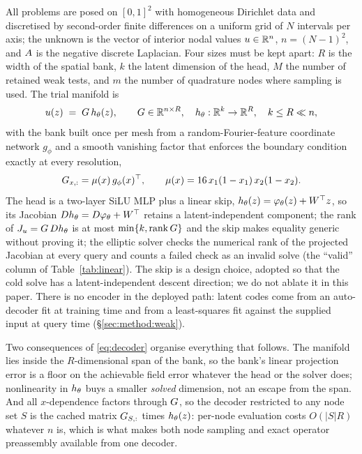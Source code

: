 All problems are posed on $[0,1]^2$ with homogeneous Dirichlet data and
discretised by second-order finite differences on a uniform grid of $N$
intervals per axis; the unknown is the vector of interior nodal values
$u\in\mathbb{R}^{n}$, $n=(N-1)^2$, and $A$ is the negative discrete Laplacian.
Four sizes must be kept apart: $R$ is the width of the spatial bank, $k$ the
latent dimension of the head, $M$ the number of retained weak tests, and $m$ the
number of quadrature nodes where sampling is used. The trial manifold is
\begin{equation}
  u(z) \;=\; G\,h_\theta(z),
  \qquad
  G\in\mathbb{R}^{n\times R},\quad
  h_\theta:\mathbb{R}^{k}\to\mathbb{R}^{R},\quad k\le R\ll n,
  \label{eq:decoder}
\end{equation}
with the bank built once per mesh from a random-Fourier-feature coordinate
network $g_\phi$ \citep{Tancik2020FourierFeatures} and a smooth vanishing
factor that enforces the boundary condition exactly at every resolution,
\begin{equation}
  G_{x,:} = \mu(x)\,g_\phi(x)^{\top},
  \qquad
  \mu(x) = 16\,x_1(1-x_1)\,x_2(1-x_2).
  \label{eq:bank}
\end{equation}
The head is a two-layer SiLU MLP plus a linear skip,
$h_\theta(z)=\varphi_\theta(z)+W^{\top}z$, so its Jacobian
$Dh_\theta=D\varphi_\theta+W^{\top}$ retains a latent-independent component; the rank
of $J_{u}=G\,Dh_\theta$ is at most $\min\{k,\operatorname{rank}G\}$ and the
skip makes equality generic without proving it; the elliptic solver checks the
numerical rank of the projected Jacobian at every query and counts a failed
check as an invalid solve (the ``valid'' column of Table~\ref{tab:linear}).
The skip is a design choice, adopted so that the cold solve has a
latent-independent descent direction; we do not ablate it in this paper. There is no
encoder in the deployed path: latent codes come from an auto-decoder fit at
training time and from a least-squares fit against the supplied input at query
time (\S\ref{sec:method:weak}).

Two consequences of \eqref{eq:decoder} organise everything that follows. The
manifold lies inside the $R$-dimensional span of the bank, so the bank's linear
projection error is a floor on the achievable field error whatever the head or
the solver does; nonlinearity in $h_\theta$ buys a smaller \emph{solved} dimension,
not an escape from the span. And all $x$-dependence factors through $G$, so
the decoder restricted to any node set $S$ is the cached matrix $G_{S,:}$
times $h_\theta(z)$: per-node evaluation costs $O(|S|R)$ whatever $n$ is,
which is what makes both node sampling and exact operator preassembly available
from one decoder.

